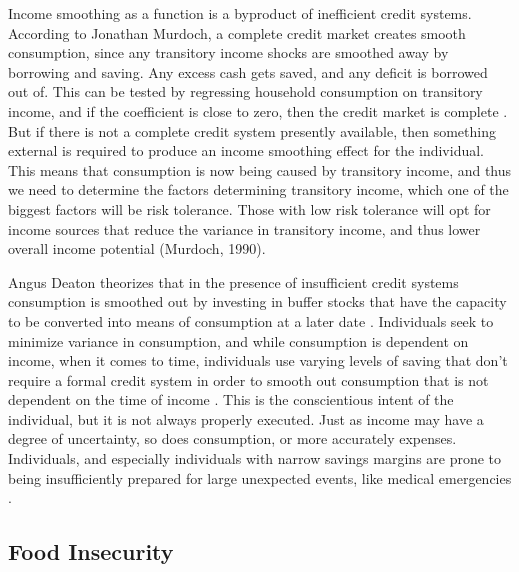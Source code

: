 \documentclass[../main.tex]{subfiles}
\begin{document}
Income smoothing as a function is a byproduct of inefficient credit systems. According to Jonathan Murdoch, a complete credit market creates smooth consumption, since any transitory income shocks are smoothed away by borrowing and saving. Any excess cash gets saved, and any deficit is borrowed out of. This can be tested by regressing household consumption on transitory income, and if the coefficient is close to zero, then the credit market is complete \parencite{morduch_income_1995}. But if there is not a complete credit system presently available, then something external is required to produce an income smoothing effect for the individual. This means that consumption is now being caused by transitory income, and thus we need to determine the factors determining transitory income, which one of the biggest factors will be risk tolerance. Those with low risk tolerance will opt for income sources that reduce the variance in transitory income, and thus lower overall income potential (Murdoch, 1990). 

Angus Deaton theorizes that in the presence of insufficient credit systems consumption is smoothed out by investing in buffer stocks that have the capacity to be converted into means of consumption at a later date \parencite{deaton_saving_1991}. Individuals seek to minimize variance in consumption, and while consumption is dependent on income, when it comes to time, individuals use varying levels of saving that don’t require a formal credit system in order to smooth out consumption that is not dependent on the time of income \parencite{deaton_saving_1991}. This is the conscientious intent of the individual, but it is not always properly executed. Just as income may have a degree of uncertainty, so does consumption, or more accurately expenses. Individuals, and especially individuals with narrow savings margins are prone to being insufficiently prepared for large unexpected events, like medical emergencies \parencite{mani_poverty_2013}.

\subsection{Food Insecurity}
\end{document}
